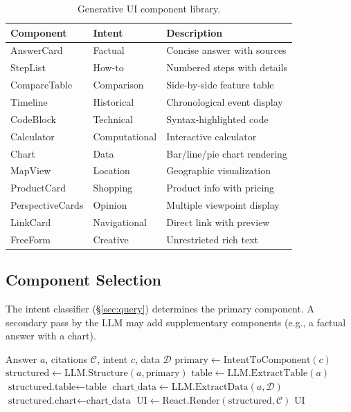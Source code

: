 \documentclass[11pt,twocolumn]{article}
\begin{document}
\begin{table}[H]
\centering
\small
\begin{tabular}{lll}
\toprule
\textbf{Component} & \textbf{Intent} & \textbf{Description} \\
\midrule
AnswerCard & Factual & Concise answer with sources \\
StepList & How-to & Numbered steps with details \\
CompareTable & Comparison & Side-by-side feature table \\
Timeline & Historical & Chronological event display \\
CodeBlock & Technical & Syntax-highlighted code \\
Calculator & Computational & Interactive calculator \\
Chart & Data & Bar/line/pie chart rendering \\
MapView & Location & Geographic visualization \\
ProductCard & Shopping & Product info with pricing \\
PerspectiveCards & Opinion & Multiple viewpoint display \\
LinkCard & Navigational & Direct link with preview \\
FreeForm & Creative & Unrestricted rich text \\
\bottomrule
\end{tabular}
\caption{Generative UI component library.}
\label{tab:components}
\end{table}

\subsection{Component Selection}

The intent classifier (\S\ref{sec:query}) determines the primary component. A secondary pass by the LLM may add supplementary components (e.g., a factual answer with a chart).

\begin{algorithm}[H]
\caption{Generative UI Rendering}
\label{alg:genui}
\begin{algorithmic}[1]
\Require Answer $a$, citations $\mathcal{C}$, intent $c$, data $\mathcal{D}$
\State $\text{primary} \gets \text{IntentToComponent}(c)$
\State $\text{structured} \gets \text{LLM.Structure}(a, \text{primary})$
\State {}
    \State $\text{table} \gets \text{LLM.ExtractTable}(a)$
    \State $\text{structured.table} \gets \text{table}$
    \State $\text{chart\_data} \gets \text{LLM.ExtractData}(a, \mathcal{D})$
    \State $\text{structured.chart} \gets \text{chart\_data}$
\EndIf
\State $\text{UI} \gets \text{React.Render}(\text{structured}, \mathcal{C})$
\State \Return $\text{UI}$
\end{algorithmic}
\end{algorithm}
\end{document}
